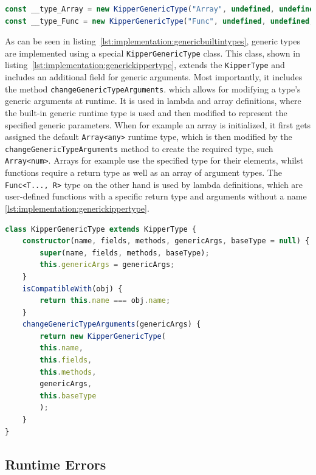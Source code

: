 \begin{lstlisting}[language=Typescript,caption=Generic built-in types,label=lst:implementation:genericbuiltintypes]
const __type_Array = new KipperGenericType("Array", undefined, undefined, {T: __type_any});
const __type_Func = new KipperGenericType("Func", undefined, undefined, {T: [], R: __type_any});
\end{lstlisting}

As can be seen in listing~\ref{lst:implementation:genericbuiltintypes}, generic types are implemented using a special \lstinline|KipperGenericType| class. This class, shown in listing~\ref{lst:implementation:generickippertype}, extends the \lstinline|KipperType| and includes an additional field for generic arguments. Most importantly, it includes the method \lstinline|changeGenericTypeArguments|. which allows for modifying a type's generic arguments at runtime. It is used in lambda and array definitions, where the built-in generic runtime type is used and then modified to represent the specified generic parameters. When for example an array is initialized, it first gets assigned the default \lstinline|Array<any>| runtime type, which is then modified by the  \lstinline|changeGenericTypeArguments| method to create the required type, such  \lstinline|Array<num>|. Arrays for example use the specified type for their elements, whilst functions require a return type as well as an array of argument types. The \lstinline|Func<T..., R>| type on the other hand is used by lambda definitions, which are user-defined functions with a specific return type and arguments without a name \ref{lst:implementation:generickippertype}.

\begin{lstlisting}[language=Typescript,caption=Generic Kipper Type,label=lst:implementation:generickippertype]
class KipperGenericType extends KipperType {
	constructor(name, fields, methods, genericArgs, baseType = null) {
		super(name, fields, methods, baseType);
		this.genericArgs = genericArgs;
	}
	isCompatibleWith(obj) {
		return this.name === obj.name;
	}
	changeGenericTypeArguments(genericArgs) {
		return new KipperGenericType(
		this.name,
		this.fields,
		this.methods,
		genericArgs,
		this.baseType
		);
	}
}
\end{lstlisting}

\subsection{Runtime Errors}

